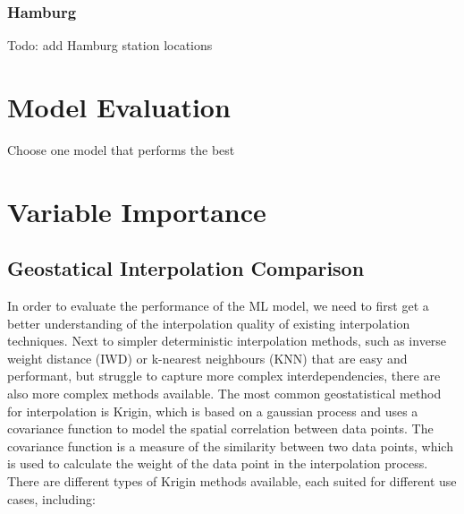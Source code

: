 \subsubsection{Hamburg}

Todo: add Hamburg station locations\\

\section{Model Evaluation}

Choose one model that performs the best

\section{Variable Importance}

\subsection{Geostatical Interpolation Comparison}
In order to evaluate the performance of the ML model, we need to first get a better understanding of the interpolation quality of existing interpolation techniques. Next to simpler deterministic interpolation methods, such as inverse weight distance (IWD) or k-nearest neighbours (KNN) that are easy and performant, but struggle to capture more complex interdependencies, there are also more complex methods available. The most common geostatistical method for interpolation is Krigin, which is based on a gaussian process and uses a covariance function to model the spatial correlation between data points. The covariance function is a measure of the similarity between two data points, which is used to calculate the weight of the data point in the interpolation process. There are different types of Krigin methods available, each suited for different use cases, including:

